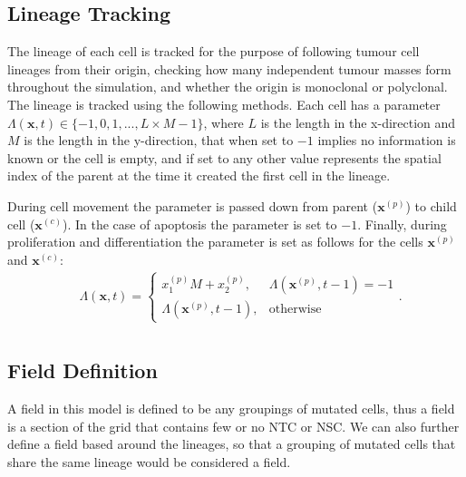 \documentclass[\main/thesis.tex]{subfiles}
\begin{document}
\subsection{Lineage Tracking}
The lineage of each cell is tracked for the purpose of following tumour cell lineages from their origin, checking how many independent tumour masses form throughout the simulation, and whether the origin is monoclonal or polyclonal. The lineage is tracked using the following methods. Each cell has a parameter
$\Lambda(\boldsymbol{x}, t) {\in} \{ {-}1, 0, 1, ..., L {\times} M {-} 1 \}$, where $L$ is the length in the x-direction and $M$ is the length in the y-direction, that when set to ${-}1$ implies no information is known or the cell is empty, and if set to any other value represents the spatial index of the parent at the time it created the first cell in the lineage. 

During cell movement the parameter is passed down from parent ($\boldsymbol{x}^{(p)}$) to child cell ($\boldsymbol{x}^{(c)}$). In the case of apoptosis the parameter is set to ${-}1$. Finally, during proliferation and differentiation the parameter is set as follows for the cells $\boldsymbol{x}^{(p)}$ and $\boldsymbol{x}^{(c)}$:
\begin{align}
&\Lambda(\boldsymbol{x}, t) {=} \begin{cases}
                           x_1^{(p)} M {+} x_2^{(p)},
                            & \Lambda(\boldsymbol{x}^{(p)}, t{-}1) {=} -1 \\
                           \Lambda(\boldsymbol{x}^{(p)}, t{-}1), 
                            & \text{otherwise}
                          \end{cases}.\label{eq:LineageTracker}\\
\end{align}

\subsection{Field Definition}
A field in this model is defined to be any groupings of mutated cells, thus a field is a section of the grid that contains few or no NTC or NSC. 
We can also further define a field based around the lineages, so that a grouping of mutated cells that share the same lineage would be considered a field. 
\end{document}
